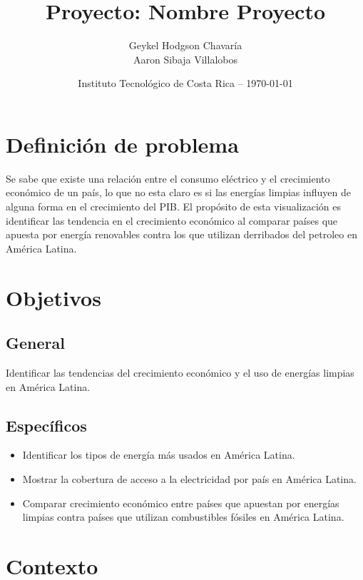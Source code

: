 \documentclass{article}
\title{Proyecto: Nombre Proyecto} %
\author{Geykel Hodgson Chavaría\\ 
Aaron Sibaja Villalobos  
} %
\date{Instituto  Tecnológico de Costa Rica -- \today} %
\begin{document}
\maketitle %


\section{Definición de problema}
Se sabe que existe una relación entre el consumo eléctrico y el crecimiento económico de un país, lo que no esta claro es si las energías limpias influyen de alguna forma en el crecimiento del PIB. El propósito de esta visualización es identificar las tendencia en el crecimiento económico al comparar países que apuesta por energía renovables contra los que utilizan derribados del petroleo en América Latina.

\section{Objetivos}
\subsection{General}
Identificar las tendencias del crecimiento económico y el uso de energías limpias en América Latina.
\subsection{Específicos }
\begin{itemize}
    \item Identificar los tipos de energía más usados en América Latina.
    \item Mostrar la cobertura de acceso a la electricidad por país en América Latina.
    \item Comparar crecimiento económico entre países que apuestan por energías limpias contra países que utilizan combustibles fósiles en América Latina.
\end{itemize}

\section{Contexto}
\end{document}
